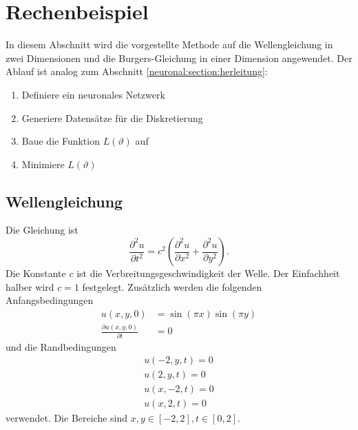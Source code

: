 %
%
%
%

\section{Rechenbeispiel\label{neuronal:section:rechenbeispiel}}

In diesem Abschnitt wird die vorgestellte Methode auf die Wellengleichung in zwei Dimensionen und die Burgers-Gleichung in einer Dimension angewendet.
Der Ablauf ist analog zum Abschnitt \ref{neuronal:section:herleitung}:
\begin{enumerate}
    \item Definiere ein neuronales Netzwerk
    \item Generiere Datensätze für die Diskretierung
    \item Baue die Funktion $L(\vartheta)$ auf
    \item Minimiere $L(\vartheta)$
\end{enumerate}

\subsection{Wellengleichung}\label{neuronal:subsection:wellengleichung}
Die Gleichung ist
\begin{equation}
    \frac{\partial^2 u}{\partial t^2} = c^2 \left( \frac{\partial^2 u}{\partial x^2} + \frac{\partial^2 u}{\partial y^2} \right).
    \label{neuronal:wellengleichung}
\end{equation}
Die Konstante \( c \) ist die Verbreitungsgeschwindigkeit der Welle. Der Einfachheit halber wird $c = 1$ festgelegt.
Zusätzlich werden die folgenden Anfangsbedingungen
\begin{equation}
    \begin{aligned}
        u(x, y, 0) &= \sin(\pi x) \sin(\pi y)\\
        \frac{\partial u(x, y, 0)}{\partial t} &= 0
    \end{aligned}
    \label{neuronal:wellen_anfangs}
\end{equation}
und die Randbedingungen
\begin{equation}
    \begin{aligned}
        u(-2, y, t) = 0\\
        u(2, y, t) = 0\\
        u(x, -2, t) = 0\\
        u(x, 2, t) = 0
    \end{aligned}
    \label{neuronal:wellen_rand}
\end{equation}
verwendet.
Die Bereiche sind \( x, y \in [-2,2], t \in [0,2] \).

